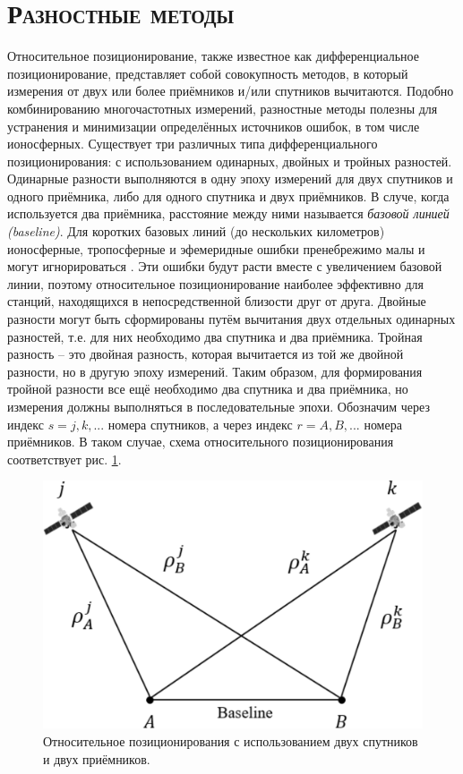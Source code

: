 \section{\textsc{Разностные методы}}

Относительное позиционирование, также известное как дифференциальное позиционирование, представляет собой совокупность методов, в который измерения от двух или более приёмников и/или спутников вычитаются. 
Подобно комбинированию многочастотных измерений, разностные методы полезны для устранения и минимизации определённых источников ошибок, в том числе ионосферных.
Существует три различных типа дифференциального позиционирования: с использованием одинарных, двойных и тройных разностей. 
Одинарные разности выполняются в одну эпоху измерений для двух спутников и одного приёмника, либо для одного спутника и двух приёмников.
В случе, когда используется два приёмника, расстояние между ними называется \textit{базовой линией (baseline)}.
Для коротких базовых линий (до нескольких километров) ионосферные, тропосферные и эфемеридные ошибки пренебрежимо малы и могут игнорироваться \cite{Seeber2003}. 
Эти ошибки будут расти вместе с увеличением базовой линии, поэтому относительное позиционирование наиболее эффективно для станций, находящихся в непосредственной близости друг от друга.
Двойные разности могут быть сформированы путём вычитания двух отдельных одинарных разностей, т.е. для них необходимо два спутника и два приёмника. 
Тройная разность -- это двойная разность, которая вычитается из той же двойной разности, но в другую эпоху измерений.
Таким образом, для формирования тройной разности все ещё необходимо два спутника и два приёмника, но измерения должны выполняться в последовательные эпохи.
Обозначим через индекс $s=j,k,...$ номера спутников, а через индекс $r=A,B,...$ номера приёмников. 
В таком случае, схема относительного позиционирования соответствует рис. \ref{fig-relative-pos}.
\vspace{1em}
\begin{figure}[h]
\centering    
\includegraphics[width=0.5\linewidth]{fig/relative-pos.png}    
\caption{Относительное позиционирования с использованием двух спутников и двух приёмников.}
\label{fig-relative-pos}      
\end{figure}  

